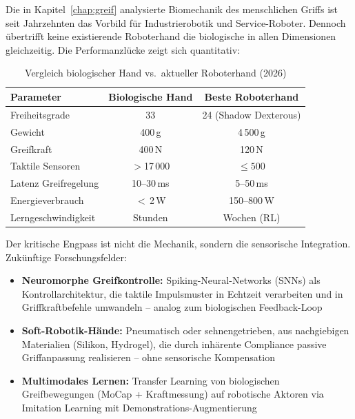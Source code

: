 ﻿\documentclass[12pt,a4paper]{report}
\theoremstyle{plain}
\theoremstyle{definition}
\theoremstyle{remark}
\begin{document}
Die in Kapitel~\ref{chap:greif} analysierte Biomechanik des menschlichen
Griffs ist seit Jahrzehnten das Vorbild für Industrierobotik und
Service-Roboter. Dennoch übertrifft keine existierende Roboterhand
die biologische in allen Dimensionen gleichzeitig. Die Performanzlücke
zeigt sich quantitativ:

\begin{table}[ht]
\centering
\caption{Vergleich biologischer Hand vs.\ aktueller Roboterhand (2026)}
\begin{tabular}{lcc}
\toprule
\textbf{Parameter} & \textbf{Biologische Hand} & \textbf{Beste Roboterhand} \\
\midrule
Freiheitsgrade      & 33              & 24 (Shadow Dexterous) \\
Gewicht             & 400\,g          & 4\,500\,g \\
Greifkraft          & 400\,N          & 120\,N \\
Taktile Sensoren    & $>$17\,000      & $\leq 500$ \\
Latenz Greifregelung & 10--30\,ms     & 5--50\,ms \\
Energieverbrauch    & $<$\,2\,W       & 150--800\,W \\
Lerngeschwindigkeit & Stunden         & Wochen (RL) \\
\bottomrule
\end{tabular}
\label{tab:hand_vs_robot}
\end{table}

Der kritische Engpass ist nicht die Mechanik, sondern die sensorische
Integration. Zukünftige Forschungsfelder:

\begin{itemize}
\item \textbf{Neuromorphe Greifkontrolle:} Spiking-Neural-Networks
  (SNNs) als Kontrollarchitektur, die taktile Impulsmuster in
  Echtzeit verarbeiten und in Griffkraftbefehle umwandeln -- analog
  zum biologischen Feedback-Loop
\item \textbf{Soft-Robotik-Hände:} Pneumatisch oder sehnengetrieben,
  aus nachgiebigen Materialien (Silikon, Hydrogel), die durch
  inhärente Compliance passive Griffanpassung realisieren -- ohne
  sensorische Kompensation
\item \textbf{Multimodales Lernen:} Transfer Learning von biologischen
  Greifbewegungen (MoCap + Kraftmessung) auf robotische Aktoren via
  Imitation Learning mit Demonstrations-Augmentierung
\end{itemize}
\end{document}
